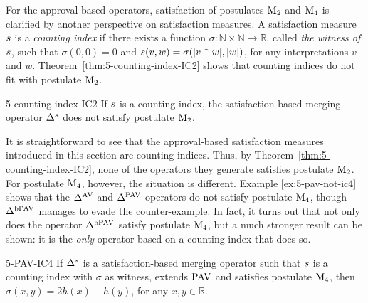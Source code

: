 For the approval-based operators, satisfaction of postulates $\mathrm{M}_{2}$ and $\mathrm{M}_{4}$ 
is clarified by another perspective on satisfaction measures. %
A satisfaction measure $s$ is a \emph{counting index} if there exists a function 
$\sigma\colon\mathbb{N}\times\mathbb{N}\to\mathbb{R}$,
called \emph{the witness of $s$}, such that 
$\sigma(0,0)=0$ and $s(v,w)=\sigma(|v\cap w|,|w|)$,
for any interpretations $v$ and $w$.
Theorem~\ref{thm:5-counting-index-IC2} shows that counting indices do not fit with postulate $\mathrm{M}_{2}$.

\begin{thm}{\cite{HaretLPW20}}{5-counting-index-IC2}
	If $s$ is a counting index, the satisfaction-based merging operator $\Delta^s$ 
	does not satisfy postulate $\mathrm{M}_{2}$.
\end{thm}


It is straightforward to see
that the approval-based satisfaction measures introduced in this section
are counting indices.
Thus, by Theorem~\ref{thm:5-counting-index-IC2}, none of the operators they generate
satisfies postulate $\mathrm{M}_{2}$.
For postulate $\mathrm{M}_{4}$, however, the situation is different. 
Example \ref{ex:5-pav-not-ic4} shows that the $\Delta^{\mathrm{AV}}$ and $\Delta^{\mathrm{PAV}}$ operators 
do not satisfy postulate $\mathrm{M}_{4}$, though $\Delta^{\mathrm{bPAV}}$ manages to evade the counter-example.
In fact, it turns out that not only does the operator $\Delta^{\mathrm{bPAV}}$
satisfy postulate $\mathrm{M}_{4}$, but a much stronger result can be shown: 
it is the \emph{only} operator based on a counting index that does so.

\begin{thm}{\cite{HaretLPW20}}{5-PAV-IC4}
	If $\Delta^s$ is a satisfaction-based merging operator such 
	that $s$ is a counting index with $\sigma$ as witness, 
	extends $\mathrm{PAV}$ and satisfies postulate $\mathrm{M}_{4}$, 
	then $\sigma(x,y)=2h(x)-h(y)$, for any $x,y\in\mathbb{R}$.
\end{thm}

